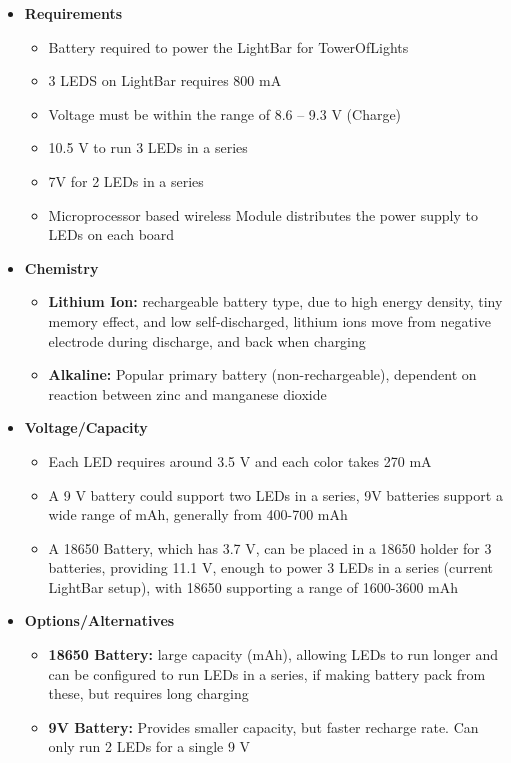\documentclass[12pt]{article}
\begin{document}
{{		%
		{\renewcommand\labelitemi{}
			\begin{itemize}
				\item \textbf{Requirements}
					\begin{itemize}
						\item Battery required to power the LightBar for TowerOfLights
						\item 3 LEDS on LightBar requires 800 mA
						\item Voltage must be within the range of 8.6 – 9.3 V (Charge)
						\item 10.5 V to run 3 LEDs in a series
						\item 7V for 2 LEDs in a series
						\item Microprocessor based wireless Module distributes the power supply to LEDs on each board
					\end{itemize}
				\item \textbf{Chemistry}
					\begin{itemize}
						\item \textbf{Lithium Ion:} rechargeable battery type, due to high energy density, tiny memory effect, and low self-discharged, lithium ions move from negative electrode during discharge, and back when charging
						\item \textbf{Alkaline:} Popular primary battery (non-rechargeable), dependent on reaction between zinc and manganese dioxide
					\end{itemize}
				\item \textbf{Voltage/Capacity}
					\begin{itemize}
						\item Each LED requires around 3.5 V and each color takes 270 mA
						\item A 9 V battery could support two LEDs in a series, 9V batteries support a wide range of mAh, generally from 400-700 mAh
						\item A 18650 Battery, which has 3.7 V, can be placed in a 18650 holder for 3 batteries, providing 11.1 V, enough to power 3 LEDs in a series (current LightBar setup), with 18650 supporting a range of 1600-3600 mAh
					\end{itemize}
				\item \textbf{Options/Alternatives}
					\begin{itemize}
						\item \textbf{18650 Battery:} large capacity (mAh), allowing LEDs to run longer and can be configured to run LEDs in a series, if making battery pack from these, but requires long charging
						\item \textbf{9V Battery:} Provides smaller capacity, but faster recharge rate. Can only run 2 LEDs for a single 9 V
					\end{itemize}
			\end{itemize}
	
}}}
\end{document}
